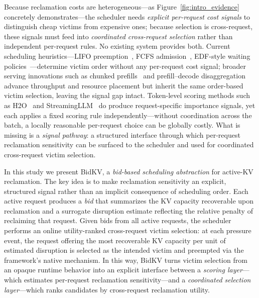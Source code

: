 \documentclass[sigconf,nonacm]{acmart}
\newcommand{\bidkv}{BidKV\xspace}
\begin{document}
Because reclamation costs are heterogeneous---as
Figure~\ref{fig:intro_evidence} concretely demonstrates---the scheduler needs
\emph{explicit per-request cost signals} to distinguish cheap victims from
expensive ones; because selection is cross-request, these signals must feed
into \emph{coordinated cross-request selection} rather than independent
per-request rules.  No existing system provides both.  Current scheduling
heuristics---LIFO preemption~\cite{Kwon2023}, FCFS
admission~\cite{Yu2022}, EDF-style waiting
policies~\cite{Gujarati2020}---determine victim order without any
per-request cost signal; broader serving innovations such as chunked
prefills~\cite{Agrawal2024sarathiserve} and prefill--decode
disaggregation~\cite{Zhong2024, Patel2024} advance throughput and resource
placement but inherit the same order-based victim selection, leaving the
signal gap intact.  Token-level scoring methods such as
H2O~\cite{Zhang2023h2o} and StreamingLLM~\cite{Xiao2024} do produce
request-specific importance signals, yet each applies a fixed scoring rule
independently---without coordination across the batch, a locally reasonable
per-request choice can be globally costly.  What is missing is a
\emph{signal pathway}: a structured interface through which per-request
reclamation sensitivity can be surfaced to the scheduler and used for
coordinated cross-request victim selection.

In this study we present \bidkv, a \emph{bid-based scheduling abstraction} for
active-KV reclamation.  The key idea is to make reclamation sensitivity an
explicit, structured signal rather than an implicit consequence of scheduling
order.  Each active request produces a \emph{bid} that summarizes the KV
capacity recoverable upon reclamation and a surrogate disruption estimate
reflecting the relative penalty of reclaiming that request.  Given bids from all active requests, the scheduler performs an online
utility-ranked cross-request victim selection: at each pressure event, the
request offering the most recoverable KV capacity per unit of estimated
disruption is selected as the intended victim and preempted via the
framework's native mechanism.  In this way, \bidkv turns victim
selection from an opaque runtime behavior into an explicit interface between a
\emph{scoring layer}---which estimates per-request reclamation
sensitivity---and a \emph{coordinated selection layer}---which ranks candidates by
cross-request reclamation utility.
\end{document}
